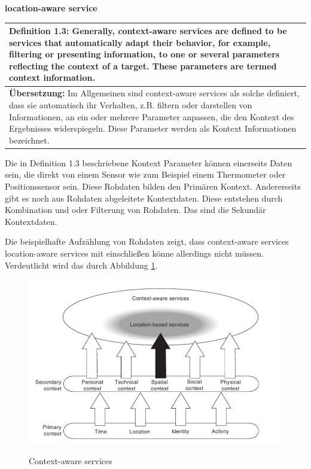 \textbf{location-aware service} \\
\begin{table}[h]
	\centering
	\begin{tabular}{|p{16cm}|}\hline
		\textbf{Definition 1.3:} \glqq Generally, context-aware services are defined to be services that automatically adapt their behavior, for example, filtering or presenting information, to one or several parameters reflecting the context of a target. These parameters are termed context information.\grqq \cite[S.2]{Kuepper2005}\\ \hline
		\textbf{Übersetzung:} Im Allgemeinen sind context-aware services als solche definiert, dass sie automatisch ihr Verhalten, z.B. filtern oder darstellen von Informationen, an ein oder mehrere Parameter anpassen, die den Kontext des Ergebnisses widerspiegeln. Diese Parameter werden als Kontext Informationen bezeichnet. \\ \hline
	\end{tabular}
\end{table}

Die in Definition 1.3 beschriebene Kontext Parameter können einerseits Daten sein, die direkt von einem Sensor wie zum Beispiel einem Thermometer oder Positionssensor sein. Diese Rohdaten bilden den Primären Kontext. Andererseits gibt es noch aus Rohdaten abgeleitete Kontextdaten. Diese entstehen durch Kombination und oder Filterung von Rohdaten. Das sind die Sekundär Kontextdaten. 
\cite[S.2]{Kuepper2005}

Die beispielhafte Aufzählung von Rohdaten zeigt, dass context-aware services location-aware services mit einschließen könne allerdings nicht müssen. Verdeutlicht wird das durch Abbildung \ref{fig:context-aware services}.


\begin{figure}[h]
\centering
\includegraphics[width=0.99\textwidth]{ref/images/definitionK.png}
\caption[Context-aware services]{Context-aware services}
\label{fig:context-aware services}
\cite[S. 2]{Kuepper2005}
\end{figure}

